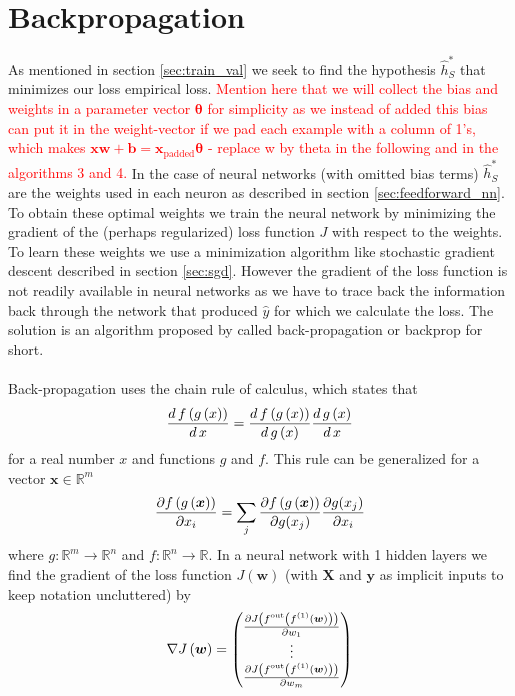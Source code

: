\section{Backpropagation} \label{sec:backprop}
As mentioned in section \ref{sec:train_val} we seek to find the hypothesis $\hat{h}^*_S$ that minimizes our loss empirical loss. \textcolor{red}{Mention here that we will collect the bias and weights in a parameter vector $\boldsymbol{\theta}$ for simplicity as we instead of added this bias can put it in the weight-vector if we pad each example with a column of 1's, which makes $\boldsymbol{x}\boldsymbol{w}+\boldsymbol{b} = \boldsymbol{x}_{\text{padded}} \boldsymbol{\theta}$ - replace w by theta in the following and in the algorithms 3 and 4.} In the case of neural networks (with omitted bias terms) $\hat{h}^*_S$ are the weights used in each neuron as described in section \ref{sec:feedforward_nn}. To obtain these optimal weights we train the neural network by minimizing the gradient of the (perhaps regularized) loss function $J$ with respect to the weights. To learn these weights we use a minimization algorithm like stochastic gradient descent described in section \ref{sec:sgd}. However the gradient of the loss function is not readily available in neural networks as we have to trace back the information back through the network that produced $\hat{y}$ for which we calculate the loss. The solution is an algorithm proposed by \cite{Rumelhart:1986a} called back-propagation or backprop for short.\\
\\
Back-propagation uses the chain rule of calculus, which states that
\begin{equation*}
    \frac{d \, f\left (g\left (x\right)\right)}{d \, x} = \frac{d \, f\left (g\left (x\right)\right)}{d \, g \left (x\right)} \frac{d \, g\left (x\right)}{d \, x}
\end{equation*}
for a real number $x$ and functions $g$ and $f$. This rule can be generalized for a vector $\boldsymbol{x} \in \mathbb{R}^m$
\begin{equation*}
    \frac{\partial f\left (g\left (\boldsymbol{x}\right)\right)}{\partial x_i} = \sum_j \frac{\partial f\left (g\left (\boldsymbol{x}\right)\right)}{\partial g(x_j)} \frac{\partial g(x_j)}{\partial x_i}
\end{equation*}
where $g: \mathbb{R}^m \rightarrow \mathbb{R}^n$ and $f: \mathbb{R}^n \rightarrow \mathbb{R}$. In a neural network with 1 hidden layers we find the gradient of the loss function $J(\boldsymbol{w})$ (with $\boldsymbol{X}$ and $\boldsymbol{y}$ as implicit inputs to keep notation uncluttered) by
\begin{equation} \label{eq:loss_grad}
    \nabla J\left (\boldsymbol{w}\right) = \begin{pmatrix}
    \frac{\partial J\left (f^{\text{out}} \left (f^{(1)}\left (\boldsymbol{w}\right)\right)\right)}{\partial w_1} \\
    \vdots\\
    \frac{\partial J\left (f^{\text{out}} \left (f^{(1)}\left (\boldsymbol{w}\right)\right)\right)}{\partial w_m}
    \end{pmatrix}
\end{equation}
